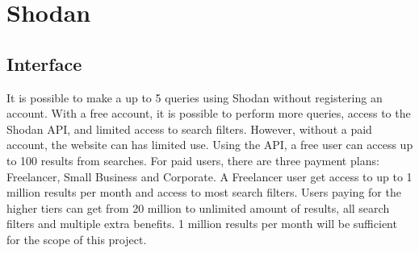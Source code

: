 \section{Shodan}\label{sec:shodan}
\subsection{Interface} 
It is possible to make a up to 5 queries using Shodan without registering an account. 
With a free account, it is possible to perform more queries, access to the Shodan API, and limited access to search filters. However, without a paid account, the website can has limited use.
Using the API, a free user can access up to 100 results from searches. 
For paid users, there are three payment plans: Freelancer, Small Business and Corporate. A Freelancer user get access to up to 1 million results per month and access to most search filters. 
Users paying for the higher tiers can get from 20 million to unlimited amount of results, all search filters and multiple extra benefits. 
1 million results per month will be sufficient for the scope of this project.